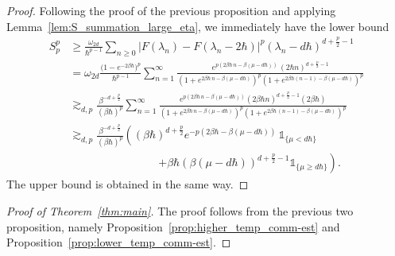 \documentclass[11pt]{amsart}
\theoremstyle{plain}
\theoremstyle{definition}
\newcommand		{\lt}			{\left}				%
\newcommand		{\rt}			{\right}			%
\renewcommand	{\(}			{\lt(}
\renewcommand	{\)}			{\rt)}
\newcommand		{\n}[1]			{\lt\lvert #1 \rt\rvert}
\newcommand		{\indic}	{\mathds{1}}		%
\begin{document}
	\begin{proof}
		Following the proof of the previous proposition and applying Lemma~\ref{lem:S_summation_large_eta}, we immediately have the lower bound 
		\begin{align*}
			S^p_p &\ge \frac{\omega_{2d}}{\hbar^{p-1}}\sum_{n\geq 0} \n{F(\lambda_n) - F(\lambda_n-2\hbar)}^p \lt(\lambda_n-d\hbar\rt)^{d+\frac{p}{2}-1}\\
			&= \omega_{2d}\frac{\bigl(1-e^{-2\beta\hbar}\bigr)^p}{\hbar^{p-1}} \sum_{n =1}^\infty \frac{e^{p\lt(2\beta\hbar\,n-\beta\lt(\mu-d\hbar\rt)\rt)} \, \lt(2\hbar n\rt)^{d+\frac{p}{2}-1}}{\lt(1 + e^{2\beta\hbar\,n - \beta\lt(\mu-d\hbar\rt)}\rt)^p \lt(1 + e^{2\beta\hbar\lt(n-1\rt)-\beta\lt(\mu-d\hbar\rt)}\rt)^p} 
			\\
			&\gtrsim_{d, p} \frac{\beta^{-d+\frac{p}{2}}}{\lt(\beta\hbar\rt)^p} \sum_{n =1}^\infty \frac{e^{p(2\beta\hbar\,n-\beta(\mu-d\hbar))}(2\beta\hbar n)^{d+\frac{p}{2}-1}(2\beta\hbar)}{\lt(1+e^{2\beta\hbar\,n-\beta\lt(\mu-d\hbar\rt)}\rt)^p\lt(1+e^{2\beta\hbar\,(n-1)-\beta\lt(\mu-d\hbar\rt)}\rt)^p}
			\\
			&\gtrsim_{d, p} \frac{\beta^{-d+\frac{p}{2}}}{\lt(\beta\hbar\rt)^p} \lt(\lt(\beta\hbar\rt)^{d+\frac{p}{2}} e^{-p\lt(2\beta\hbar-\beta\lt(\mu-d\hbar\rt)\rt)} \, \indic_{\{\mu < d\hbar\}} \rt.
			\\
			&\qquad \qquad \qquad \qquad \lt. + \beta\hbar \lt(\beta\lt(\mu-d\hbar\rt)\rt)^{d+\frac{p}{2}-1}  \indic_{\{\mu \ge d\hbar\}}\rt) .
		\end{align*}
		The upper bound is obtained in the same way. 
	\end{proof}
	
	\begin{proof}[Proof of Theorem~\ref{thm:main}]\label{proof:main}
	   The proof follows from the previous two proposition, namely Proposition~\ref{prop:higher_temp_comm-est} and Proposition~\ref{prop:lower_temp_comm-est}.
	\end{proof}
	
\end{document}
